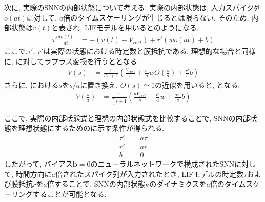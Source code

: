 次に, 実際のSNNの内部状態について考える.
実際の内部状態は, 入力スパイク列$o(at)$に対して, $a$倍のタイムスケーリングが生じるとは限らない.
そのため, 内部状態は$v(t)$と表され, LIFモデルを用いるとのようになる.
\begin{equation}
    \begin{split}
        \tau' \frac{dv(t)}{dt} &= -(v(t)-V_{rest}) + r'(w o(at) + b)
    \end{split}
    \label{sec2:eq:actual}
\end{equation}
ここで,$\tau',~r'$は実際の状態における時定数と膜抵抗である.
理想的な場合と同様に, に対してラプラス変換を行うととなる.
\begin{equation}
    \begin{split}
        V(s) &= \frac{1}{\tau' s+1}(\frac{V_{rest}}{s}+\frac{r'}{a} w O(\frac{s}{a})+\frac{r'}{s}b)
    \end{split}
    \label{sec2:eq:actual_laplace}
\end{equation}
さらに, における$s$を$s/a$に置き換え, $O(s)\simeq1$の近似を用いると, となる.
\begin{equation}
    \begin{split}
        V(\frac{s}{a}) &= \frac{1}{\frac{\tau'}{a} s+1}(\frac{aV_{rest}}{s}+\frac{r'}{a} w+\frac{a r'}{s}b)
    \end{split}
    \label{sec2:eq:actual_laplace2}
\end{equation}

ここで, 実際の内部状態式と理想の内部状態式を比較することで, SNNの内部状態を理想状態にするためのに示す条件が得られる.
\begin{equation}
    \begin{split}
        \tau'&=a \tau\\
        r'&=ar \\
        b&=0
    \end{split}
    \label{sec2:eq:condition}
\end{equation}
したがって, バイアス$\bm{b}=0$のニューラルネットワークで構成されたSNNに対して, 時間方向に$a$倍されたスパイク列が入力されたとき, LIFモデルの時定数$\tau$および膜抵抗$r$を$a$倍することで, SNNの内部状態$\bm{v}$のダイナミクスを$a$倍のタイムスケーリングすることが可能となる.

